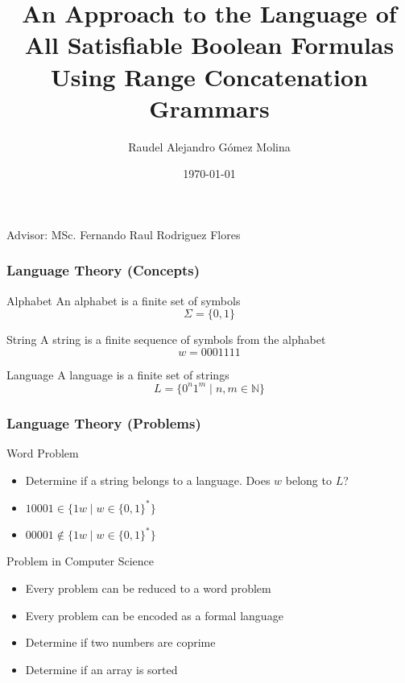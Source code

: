 \documentclass{beamer}
\title{An Approach to the Language of All Satisfiable Boolean Formulas Using Range Concatenation Grammars}
\author{Raudel Alejandro Gómez Molina}
\institute{Faculty of Mathematics and Computer Science \\ University of Havana}
\date{\today}
\newcommand{\tutor}{MSc. Fernando Raul Rodriguez Flores} %
\begin{document}
\begin{frame}
    \titlepage
    \vspace{1cm} %
    \begin{center}
        Advisor: \tutor \\ %
        \smallskip
    \end{center}
\end{frame}

\begin{frame}
    \frametitle{Language Theory (Concepts)}

    \begin{block}{Alphabet}
        An alphabet is a finite set of symbols
        $$\Sigma=\{0,1\}$$
    \end{block}

    \pause

    \begin{block}{String}
        A string is a finite sequence of symbols from the alphabet
        $$w=0001111$$
    \end{block}

    \pause

    \begin{block}{Language}
        A language is a finite set of strings
        $$L=\{0^n1^m\mid n,m\in \mathbb{N}\}$$
    \end{block}
\end{frame}

\begin{frame}
    \frametitle{Language Theory (Problems)}

    \begin{block}{Word Problem}
        \begin{itemize}
            \item Determine if a string belongs to a language. Does $w$ belong to $L$?
                  \pause
            \item $10001\in \{1w\mid w\in\{0,1\}^*\}$
                  \pause
            \item $00001\notin \{1w\mid w\in\{0,1\}^*\}$
        \end{itemize}
    \end{block}

    \pause

    \begin{block}{Problem in Computer Science}
        \begin{itemize}
            \item Every problem can be reduced to a word problem
                  \pause
            \item Every problem can be encoded as a formal language
                  \pause
            \item Determine if two numbers are coprime
                  \pause
            \item Determine if an array is sorted
        \end{itemize}
    \end{block}
\end{frame}
\end{document}
